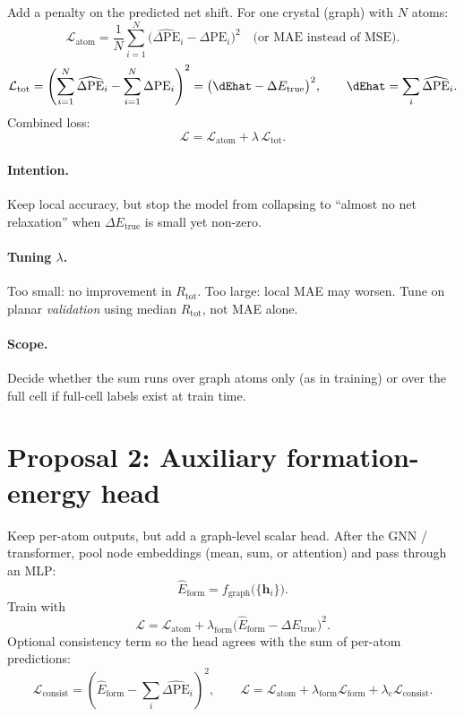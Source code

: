 \documentclass[11pt,a4paper]{article}
\newcommand{\dPE}{\Delta\mathrm{PE}}
\newcommand{\dPEhat}{\widehat{\Delta\mathrm{PE}}}
\newcommand{\dEtrue}{\Delta E_{\mathrm{true}}}
\begin{document}
Add a penalty on the predicted net shift. For one crystal (graph) with $N$ atoms:
\begin{equation}
  \mathcal{L}_{\mathrm{atom}}
  = \frac{1}{N}\sum_{i=1}^{N}
    \bigl(\dPEhat_i-\dPE_i\bigr)^2
  \quad\text{(or MAE instead of MSE).}
\end{equation}
\begin{equation}
  \mathcal{L}_{\mathrm{tot}}
  = \left(\sum_{i=1}^{N}\dPEhat_i-\sum_{i=1}^{N}\dPE_i\right)^2
  = \bigl(\dEhat-\dEtrue\bigr)^2,
  \qquad
  \dEhat=\sum_i \dPEhat_i.
\end{equation}
Combined loss:
\begin{equation}
  \mathcal{L}
  = \mathcal{L}_{\mathrm{atom}}+\lambda\,\mathcal{L}_{\mathrm{tot}}.
\end{equation}

\paragraph{Intention.} Keep local accuracy, but stop the model from collapsing to ``almost no net relaxation'' when $\dEtrue$ is small yet non-zero.

\paragraph{Tuning $\lambda$.} Too small: no improvement in $R_{\mathrm{tot}}$. Too large: local MAE may worsen. Tune on planar \emph{validation} using median $R_{\mathrm{tot}}$, not MAE alone.

\paragraph{Scope.} Decide whether the sum runs over graph atoms only (as in training) or over the full cell if full-cell labels exist at train time.

\section*{Proposal 2: Auxiliary formation-energy head}

Keep per-atom outputs, but add a graph-level scalar head. After the GNN / transformer, pool node embeddings (mean, sum, or attention) and pass through an MLP:
\begin{equation}
  \widehat{E}_{\mathrm{form}} = f_{\mathrm{graph}}\bigl(\{\mathbf{h}_i\}\bigr).
\end{equation}
Train with
\begin{equation}
  \mathcal{L}
  = \mathcal{L}_{\mathrm{atom}}
  + \lambda_{\mathrm{form}}\bigl(\widehat{E}_{\mathrm{form}}-\dEtrue\bigr)^2.
\end{equation}
Optional consistency term so the head agrees with the sum of per-atom predictions:
\begin{equation}
  \mathcal{L}_{\mathrm{consist}}
  = \left(\widehat{E}_{\mathrm{form}}-\sum_i \dPEhat_i\right)^2,
  \qquad
  \mathcal{L}
  = \mathcal{L}_{\mathrm{atom}}
  + \lambda_{\mathrm{form}}\mathcal{L}_{\mathrm{form}}
  + \lambda_{\mathrm{c}}\mathcal{L}_{\mathrm{consist}}.
\end{equation}
\end{document}
